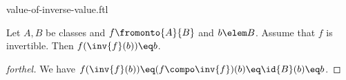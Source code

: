 \documentclass{stex}
\begin{document}
\begin{smodule}{value-of-inverse-value.ftl}


\begin{proposition}[forthel,id=ValueOfInvProp]
  Let $A, B$ be classes and $f \fromonto{A}{B}$ and $b \elem B$.
  Assume that $f$ is invertible.
  Then $f(\inv{f}(b)) \eq b$.
\end{proposition}
\begin{proof}[forthel]
  We have
  $f(\inv{f}(b))
    \eq (f \compo \inv{f})(b)
    \eq \id{B}(b)
    \eq b$.
\end{proof}

\end{smodule}
\end{document}
